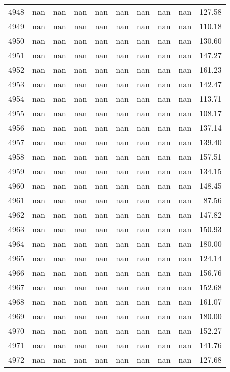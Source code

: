 \begin{tabular}{lrrrrrrrrr}
4948 & nan & nan & nan & nan & nan & nan & nan & nan & 127.58 \\
4949 & nan & nan & nan & nan & nan & nan & nan & nan & 110.18 \\
4950 & nan & nan & nan & nan & nan & nan & nan & nan & 130.60 \\
4951 & nan & nan & nan & nan & nan & nan & nan & nan & 147.27 \\
4952 & nan & nan & nan & nan & nan & nan & nan & nan & 161.23 \\
4953 & nan & nan & nan & nan & nan & nan & nan & nan & 142.47 \\
4954 & nan & nan & nan & nan & nan & nan & nan & nan & 113.71 \\
4955 & nan & nan & nan & nan & nan & nan & nan & nan & 108.17 \\
4956 & nan & nan & nan & nan & nan & nan & nan & nan & 137.14 \\
4957 & nan & nan & nan & nan & nan & nan & nan & nan & 139.40 \\
4958 & nan & nan & nan & nan & nan & nan & nan & nan & 157.51 \\
4959 & nan & nan & nan & nan & nan & nan & nan & nan & 134.15 \\
4960 & nan & nan & nan & nan & nan & nan & nan & nan & 148.45 \\
4961 & nan & nan & nan & nan & nan & nan & nan & nan & 87.56 \\
4962 & nan & nan & nan & nan & nan & nan & nan & nan & 147.82 \\
4963 & nan & nan & nan & nan & nan & nan & nan & nan & 150.93 \\
4964 & nan & nan & nan & nan & nan & nan & nan & nan & 180.00 \\
4965 & nan & nan & nan & nan & nan & nan & nan & nan & 124.14 \\
4966 & nan & nan & nan & nan & nan & nan & nan & nan & 156.76 \\
4967 & nan & nan & nan & nan & nan & nan & nan & nan & 152.68 \\
4968 & nan & nan & nan & nan & nan & nan & nan & nan & 161.07 \\
4969 & nan & nan & nan & nan & nan & nan & nan & nan & 180.00 \\
4970 & nan & nan & nan & nan & nan & nan & nan & nan & 152.27 \\
4971 & nan & nan & nan & nan & nan & nan & nan & nan & 141.76 \\
4972 & nan & nan & nan & nan & nan & nan & nan & nan & 127.68 \\

\end{tabular}
